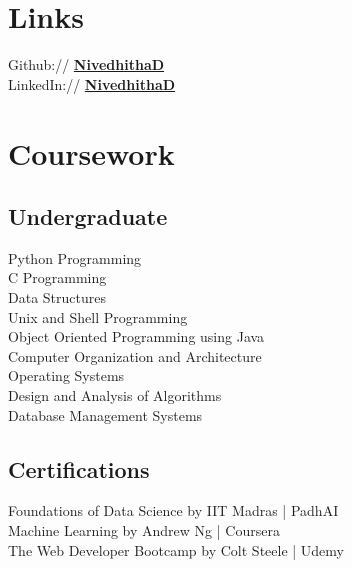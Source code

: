 \documentclass[]{deedy-resume-openfont}
\begin{document}
\begin{minipage}[t]{0.33\textwidth}
\section{Links}
Github:// \href{https://github.com/nive927}{\bf NivedhithaD} \\
LinkedIn://  \href{https://www.linkedin.com/in/nivedhitha-d-0bb67b1b0}{\bf NivedhithaD} \\


\section{Coursework}
\subsection{Undergraduate}
Python Programming \\
C Programming \\
Data Structures \\
Unix and Shell Programming \\
Object Oriented Programming using Java \\
Computer Organization and Architecture \\
Operating Systems \\
Design and Analysis of Algorithms \\
Database Management Systems \\
\sectionsep

\subsection{Certifications}
Foundations of Data Science by IIT Madras | PadhAI \\
Machine Learning by Andrew Ng | Coursera \\
The Web Developer Bootcamp by Colt Steele | Udemy \\


%
%

\end{minipage} 
\hfill
\end{document}
